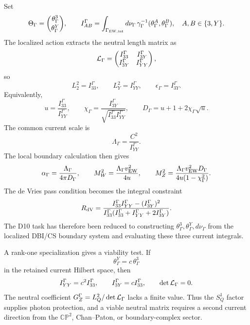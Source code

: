\documentclass[11pt]{article}
\theoremstyle{definition}
\theoremstyle{remark}
\newcommand{\CP}{\mathbb{CP}}
\begin{document}
Set
\[
  \Theta_\Gamma
  =
  \binom{\theta_\Gamma^3}{\theta_\Gamma^Y},
  \qquad
  I_{AB}^\Gamma
  =
  \int_{\Gamma_{\rm EW,int}}d\nu_\Gamma\,
  \gamma_\Gamma^{-1}(\theta_\Gamma^A,\theta_\Gamma^B),
  \quad A,B\in\{3,Y\}.
\]
The localized action extracts the neutral length matrix as
\[
  {\cal L}_\Gamma
  =
  \begin{pmatrix}
  I_{33}^\Gamma&I_{3Y}^\Gamma\\
  I_{3Y}^\Gamma&I_{YY}^\Gamma
  \end{pmatrix},
\]
so
\[
  L_2^2=I_{33}^\Gamma,\qquad
  L_Y^2=I_{YY}^\Gamma,\qquad
  \epsilon_\Gamma=I_{3Y}^\Gamma.
\]
Equivalently,
\[
  u=\frac{I_{33}^\Gamma}{I_{YY}^\Gamma},
  \qquad
  \chi_\Gamma=
  \frac{I_{3Y}^\Gamma}{\sqrt{I_{33}^\Gamma I_{YY}^\Gamma}},
  \qquad
  D_\Gamma=u+1+2\chi_\Gamma\sqrt u .
\]
The common current scale is
\[
  \Lambda_\Gamma=\frac{C^2}{I_{YY}^\Gamma}.
\]
The local boundary calculation then gives
\[
  \alpha_\Gamma
  =
  \frac{\Lambda_\Gamma}{4\pi D_\Gamma},
  \qquad
  M_W^2
  =
  \frac{\Lambda_\Gamma v_{\rm EW}^2}{4u},
  \qquad
  M_Z^2
  =
  \frac{\Lambda_\Gamma v_{\rm EW}^2D_\Gamma}
       {4u(1-\chi_\Gamma^2)}.
\]
The de Vries pass condition becomes the integral constraint
\[
  R_{\rm dV}
  =
  \frac{I_{33}^\Gamma I_{YY}^\Gamma-(I_{3Y}^\Gamma)^2}
       {I_{33}^\Gamma
       (I_{33}^\Gamma+I_{YY}^\Gamma+2I_{3Y}^\Gamma)}.
\]
The D10 task has therefore been reduced to constructing
\(\theta_\Gamma^3,\theta_\Gamma^Y,d\nu_\Gamma\) from the localized
DBI/CS boundary system and evaluating these three current integrals.

A rank-one specialization gives a viability test.  If
\[
  \theta_\Gamma^Y=c\,\theta_\Gamma^3
\]
in the retained current Hilbert space, then
\[
  I_{YY}^\Gamma=c^2I_{33}^\Gamma,
  \qquad
  I_{3Y}^\Gamma=cI_{33}^\Gamma,
  \qquad
  \det{\cal L}_\Gamma=0.
\]
The neutral coefficient \(G_Z^\Gamma=L_Q^2/\det{\cal L}_\Gamma\) lacks a
finite value.  Thus the \(S^1_Q\) factor supplies photon protection, and a
viable neutral matrix requires a second current direction from the
\(\CP^2\), Chan--Paton, or boundary-complex sector.
\end{document}
